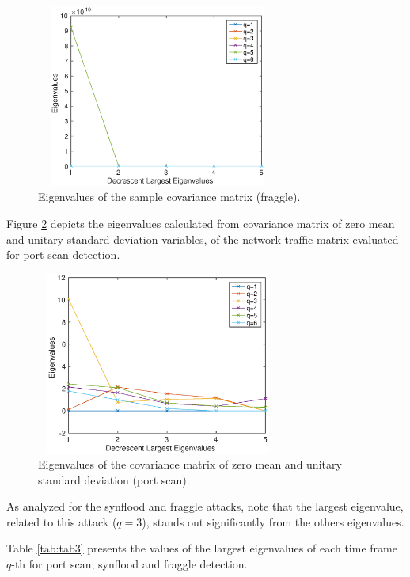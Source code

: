 \documentclass[review]{elsarticle}
\begin{document}
\begin{figure}[h!]
	\centering
     \includegraphics[height=6cm, width=8cm]{results/figures/eigenvalues_fraggle.eps}
     \caption{Eigenvalues of the sample covariance matrix (fraggle).}
     \label{fig:fig11}
\end{figure}

Figure \ref{fig:fig12} depicts the eigenvalues calculated from covariance matrix of zero mean and unitary standard deviation variables, of the network traffic matrix evaluated for port scan detection. 

\begin{figure}[h!]
	\centering
     \includegraphics[height=6cm, width=8cm]{results/figures/eigenvalues_portscan.eps}
     \caption{Eigenvalues of the covariance matrix of zero mean and unitary standard deviation (port scan).}
     \label{fig:fig12}
\end{figure}

As analyzed for the synflood and fraggle attacks, note that the largest eigenvalue, related to this attack ($q = 3$), stands out significantly from the others eigenvalues.

Table \ref{tab:tab3} presents the values of the largest eigenvalues of each time frame $q$-th for port scan, synflood and fraggle detection. 
\end{document}
